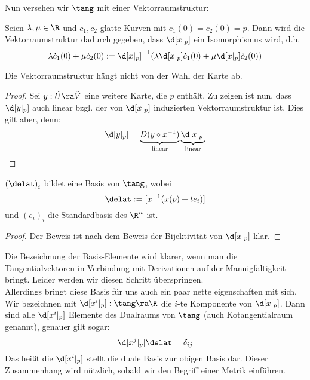 Nun versehen wir $\tang$ mit einer Vektorraumstruktur:

\begin{defin}
  Seien $\lambda, \mu \in \R$ und $c_1, c_2$ glatte Kurven mit $c_1(0) = c_2(0) = p$. Dann wird die Vektorraumstruktur dadurch gegeben, dass $\d[x|_p]$ ein Isomorphismus wird, d.h.
  \[
  \lambda \dot c_1(0) + \mu \dot c_2(0) := \d[x|_p]^{-1} ( \lambda \d[x|_p] \dot c_1(0) + \mu \d[x|_p] \dot c_2(0))
  \]
\end{defin}

\begin{lemma}
  Die Vektorraumstruktur hängt nicht von der Wahl der Karte ab.
  \label{lemma:tangvektorraum}
\end{lemma}

\begin{proof}
  Sei $y : \tilde U \ra \tilde V$ eine weitere Karte, die $p$ enthält. Zu zeigen ist nun, dass $\d[y|_p]$ auch linear bzgl. der von $\d[x|_p]$ induzierten Vektorraumstruktur ist. Dies gilt aber, denn:
  \[
  \d[y|_p] = \underbrace{D(y \circ x^{-1})}_{\text{linear}} \underbrace{\d[x|_p]}_{\text{linear}}
  \]
\end{proof}

\begin{prop}
  $\left ( \delat \right )_i$ bildet eine Basis von $\tang$, wobei
  \[
  \delat := [ x^{-1} (x(p) + te_i)]
  \]
  und $(e_i)_i$ die Standardbasis des $\R^n$ ist.
\end{prop}

\begin{proof}
  Der Beweis ist nach dem Beweis der Bijektivität von $\d[x|_p]$ klar.
\end{proof}

\begin{rem}
  Die Bezeichnung der Basis-Elemente wird klarer, wenn man die Tangentialvektoren in Verbindung mit Derivationen auf der Mannigfaltigkeit bringt. Leider werden wir diesen Schritt überspringen.\\
  Allerdings bringt diese Basis für uns auch ein paar nette eigenschaften mit sich. Wir bezeichnen mit $\d[x^i|_p]: \tang \ra \R$ die $i$-te Komponente von $\d[x|_p]$. Dann sind alle $\d[x^i|_p]$ Elemente des Dualraums von $\tang$ (auch Kotangentialraum genannt), genauer gilt sogar:
  \[
  \d[x^j|_p] \delat = \delta_{ij}
  \]
  Das heißt die $\d[x^i|_p]$ stellt die duale Basis zur obigen Basis dar. Dieser Zusammenhang wird nützlich, sobald wir den Begriff einer Metrik einführen.
\end{rem}

